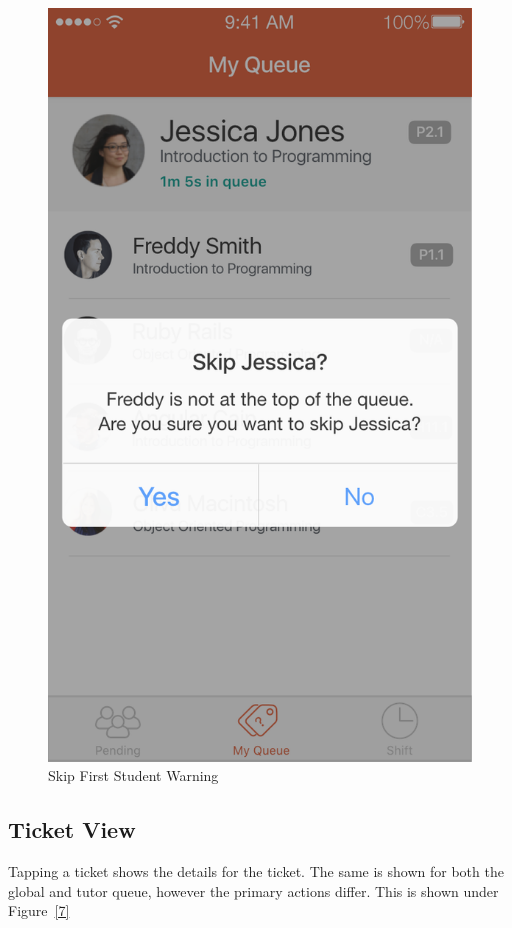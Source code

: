\documentclass[a4paper,12pt]{article}
\begin{document}
\begin{figure}[p]
\centering
\includegraphics[scale=0.5]{59e78e9997.png}
\caption{Skip First Student Warning}
\label{6}
\end{figure}


\subsection{Ticket View}\label{ticket-view}

Tapping a ticket shows the details for the ticket. The same is shown for
both the global and tutor queue, however the primary actions differ. This is
shown under Figure~\ref{7}
\end{document}
